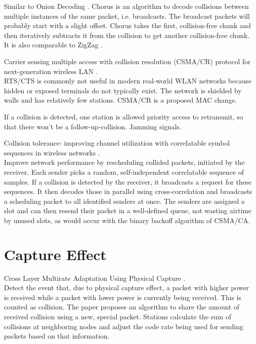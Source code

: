 Similar to Onion Decoding \cite{wang2010}. Chorus is an algorithm to decode collisions between multiple instances of the same packet, i.e. broadcasts. The broadcast packets will probably start with a slight offset. Chorus takes the first, collision-free chunk and then iteratively subtracts it from the collision to get another collision-free chunk. It is also comparable to ZigZag \cite{gollakota2008}.

Carrier sensing multiple access with collision resolution (CSMA/CR) protocol for next-generation wireless LAN \cite{choi2013}.\\

RTS/CTS is commonly not useful in modern real-world WLAN networks because hidden or exposed terminals do not typically exist. The network is shielded by walls and has relatively few stations. CSMA/CR is a proposed MAC change.

If a collision is detected, one station is allowed priority access to retransmit, so that there won't be a follow-up-collision. Jamming signals.

Collision tolerance: improving channel utilization with correlatable symbol sequences in wireless networks \cite{zhao2015}.\\

Improve network performance by rescheduling collided packets, initiated by the receiver. Each sender picks a random, self-independent correlatable sequence of samples. If a collision is detected by the receiver, it broadcasts a request for these sequences. It then decodes those in parallel using cross-correlation and broadcasts a scheduling packet to all identified senders at once. The senders are assigned a slot and can then resend their packet in a well-defined queue, not wasting airtime by unused slots, as would occur with the binary backoff algorithm of CSMA/CA.



\section{Capture Effect}

Cross Layer Multirate Adaptation Using Physical Capture \cite{park2009}.\\

Detect the event that, due to physical capture effect, a packet with higher power is received while a packet with lower power is currently being received. This is counted as collision. The paper proposes an algorithm to share the amount of received collision using a new, special packet. Stations calculate the sum of collisions at neighboring nodes and adjust the code rate being used for sending packets based on that information.

